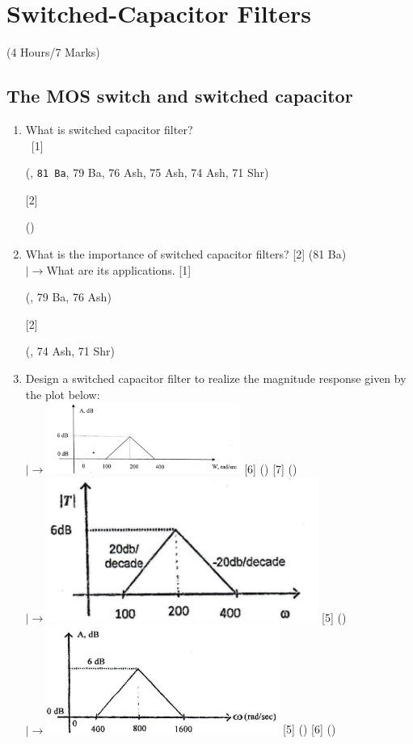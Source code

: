 \documentclass[12pt]{article}
\newcommand{\lb}{\\$\left|\rightarrow\right.$}
\newcommand{\enter}{\\\textcolor{white}{1}}
\begin{document}
	\pagebreak
	
\section{Switched-Capacitor Filters}
	\begin{center}(4 Hours/7 Marks)\end{center}
	\subsection{The MOS switch and switched capacitor}
		\begin{enumerate}[topsep=0pt, noitemsep]
			\item What is switched capacitor filter? 
			\enter\hfill [1] \begin{tiny} (, \texttt{81 Ba}, 79 Ba, 76 Ash, 75 Ash, 74 Ash, 71 Shr) \end{tiny} [2] \begin{tiny} () \end{tiny}

			\item What is the importance of switched capacitor filters? \hfill [2] (81 Ba)
			\lb What are its applications. \hfill [1] \begin{footnotesize} (, 79 Ba, 76 Ash) \end{footnotesize} [2] \begin{footnotesize} (, 74 Ash, 71 Shr) \end{footnotesize}

			\item Design a switched capacitor filter to realize the magnitude response given by the plot below:
			\lb\includegraphics[width=0.5\textwidth]{./pics/fd_1} \hfill [6] ()	[7] ()
			\lb \includegraphics[width=3.5in]{./pics/fd_17} \hfill	[5] ()
			\lb \includegraphics[width=3in]{./pics/fd_14} \hfill [5] () [6] ()


\end{enumerate}
\end{document}
